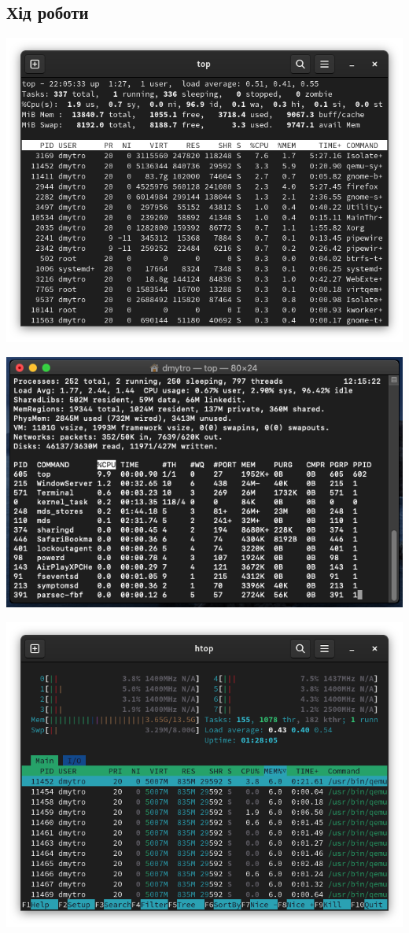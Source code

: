 \documentclass{article}
\begin{document}
\begin{normalsize}
	\section*{Хід роботи}	
	\begin{center}
		\includegraphics[scale=0.5]{top1}
	\end{center}
	\begin{center}
		\includegraphics[scale=0.5]{top2}
	\end{center}
	\begin{center}
		\includegraphics[scale=0.5]{htop1}

\end{center}
\end{normalsize}
\end{document}
